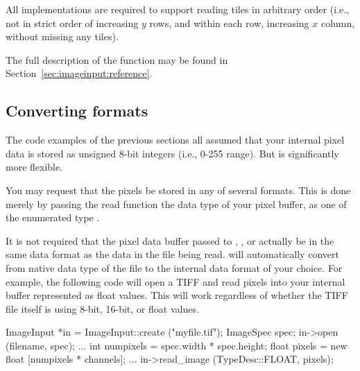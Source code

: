 All \ImageInput implementations are required to support reading tiles in
arbitrary order (i.e., not in strict order of increasing $y$ rows, and
within each row, increasing $x$ column, without missing any tiles).

The full description of the \readtile function may be found
in Section~\ref{sec:imageinput:reference}.


\subsection{Converting formats}
\label{sec:imageinput:convertingformat}

The code examples of the previous sections all assumed that your
internal pixel data is stored as unsigned 8-bit integers (i.e., 0-255
range).  But \product is significantly more flexible.  

You may request that the pixels be stored in any of several formats.
This is done merely by passing the {\cf read} function the data type
of your pixel buffer, as one of the enumerated type \TypeDesc.


It is not required that the pixel data buffer passed to \readimage,
\readscanline, or \readtile actually be in the same data format as the
data in the file being read.  \product will automatically convert from
native data type of the file to the internal data format of your choice.
For example, the following code will open a TIFF and read pixels into
your internal buffer represented as {\cf float} values.  This will work
regardless of whether the TIFF file itself is using 8-bit, 16-bit, or
float values.

\begin{code}
        ImageInput *in = ImageInput::create ("myfile.tif");
        ImageSpec spec;
        in->open (filename, spec);
        ...
        int numpixels = spec.width * spec.height;
        float pixels = new float [numpixels * channels];
        ...
        in->read_image (TypeDesc::FLOAT, pixels);
\end{code}

